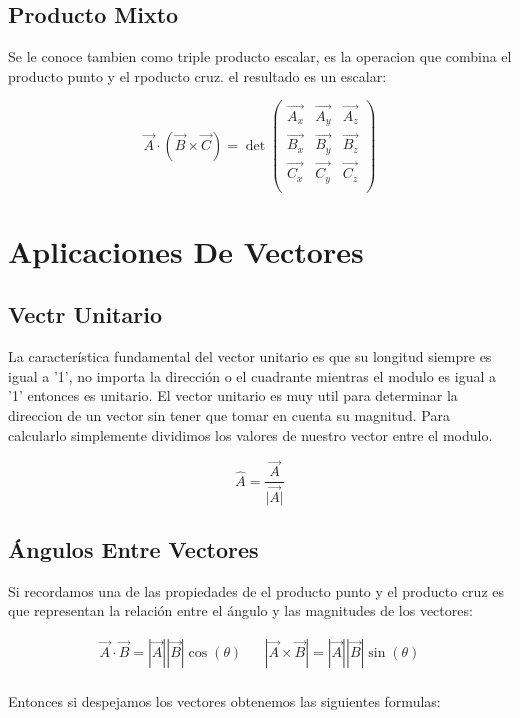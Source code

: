 \documentclass{article}
\begin{document}
\subsection{Producto Mixto}
\label{sec:org66678d8}
Se le conoce tambien como triple producto escalar, es la operacion que combina el producto punto y el rpoducto cruz. el resultado es un escalar:

\[
\vec{A}\cdot(\vec{B}\times\vec{C}) = \det\begin{pmatrix}
  \vec{A_x} & \vec{A_y} & \vec{A_z}\\
  \vec{B_x} & \vec{B_y} & \vec{B_z}\\
  \vec{C_x} & \vec{C_y} & \vec{C_z}\\
\end{pmatrix}
\]

\section{Aplicaciones De Vectores}
\label{sec:org874ef48}
\subsection{Vectr Unitario}
\label{sec:org9752202}
La característica fundamental del vector unitario es que su longitud siempre es igual a '1', no importa la dirección o el cuadrante mientras el modulo es igual a '1' entonces es unitario. El vector unitario es muy util para determinar la direccion de un vector sin tener que tomar en cuenta su magnitud. Para calcularlo simplemente dividimos los valores de nuestro vector entre el modulo.

\[ 
\hat{A} = \frac{\vec{A}}{\vert\vec{A}\vert} 
\]

\subsection{Ángulos Entre Vectores}
\label{sec:org6642f81}
Si recordamos una de las propiedades de el producto punto y el producto cruz es que representan la relación entre el ángulo y las magnitudes de los vectores:

\[ \begin{aligned}
 \vec{A}\cdot\vec{B} = |\vec{A}||\vec{B}| \cos(\theta) && |\vec{A}\times\vec{B}| = |\vec{A}||\vec{B}| \sin(\theta) \\
\end{aligned} \]

Entonces si despejamos los vectores obtenemos las siguientes formulas:
\end{document}
